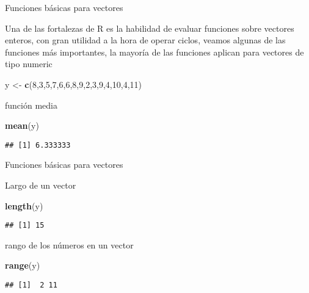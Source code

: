 \documentclass[ignorenonframetext,]{beamer}
\newenvironment{Shaded}{\begin{snugshade}}{\end{snugshade}}
\newcommand{\KeywordTok}[1]{\textcolor[rgb]{0.13,0.29,0.53}{\textbf{#1}}}
\newcommand{\DecValTok}[1]{\textcolor[rgb]{0.00,0.00,0.81}{#1}}
\newcommand{\StringTok}[1]{\textcolor[rgb]{0.31,0.60,0.02}{#1}}
\newcommand{\NormalTok}[1]{#1}
\begin{document}
\begin{frame}[fragile]{Funciones básicas para vectores}

Una de las fortalezas de R es la habilidad de evaluar funciones sobre
vectores enteros, con gran utilidad a la hora de operar ciclos, veamos
algunas de las funciones más importantes, la mayoría de las funciones
aplican para vectores de tipo numeric

\begin{Shaded}
\begin{Highlighting}[]
\NormalTok{y <-}\StringTok{ }\KeywordTok{c}\NormalTok{(}\DecValTok{8}\NormalTok{,}\DecValTok{3}\NormalTok{,}\DecValTok{5}\NormalTok{,}\DecValTok{7}\NormalTok{,}\DecValTok{6}\NormalTok{,}\DecValTok{6}\NormalTok{,}\DecValTok{8}\NormalTok{,}\DecValTok{9}\NormalTok{,}\DecValTok{2}\NormalTok{,}\DecValTok{3}\NormalTok{,}\DecValTok{9}\NormalTok{,}\DecValTok{4}\NormalTok{,}\DecValTok{10}\NormalTok{,}\DecValTok{4}\NormalTok{,}\DecValTok{11}\NormalTok{)}
\end{Highlighting}
\end{Shaded}

función media

\begin{Shaded}
\begin{Highlighting}[]
\KeywordTok{mean}\NormalTok{(y)}
\end{Highlighting}
\end{Shaded}

\begin{verbatim}
## [1] 6.333333
\end{verbatim}

\end{frame}

\begin{frame}[fragile]{Funciones básicas para vectores}

Largo de un vector

\begin{Shaded}
\begin{Highlighting}[]
\KeywordTok{length}\NormalTok{(y)}
\end{Highlighting}
\end{Shaded}

\begin{verbatim}
## [1] 15
\end{verbatim}

rango de los números en un vector

\begin{Shaded}
\begin{Highlighting}[]
\KeywordTok{range}\NormalTok{(y)}
\end{Highlighting}
\end{Shaded}

\begin{verbatim}
## [1]  2 11
\end{verbatim}

\end{frame}
\end{document}
